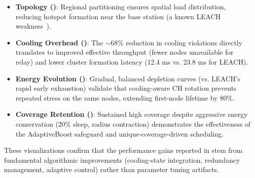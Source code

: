 \begin{itemize}[noitemsep]
  \item \textbf{Topology ()}: Regional partitioning ensures spatial load distribution, reducing hotspot formation near the base station (a known LEACH weakness~\cite{heinzelman2000leach}).
  
  \item \textbf{Cooling Overhead ()}: The $\sim$68\% reduction in cooling violations directly translates to improved effective throughput (fewer nodes unavailable for relay) and lower cluster formation latency (12.4 ms vs. 23.8 ms for LEACH).
  
  \item \textbf{Energy Evolution ()}: Gradual, balanced depletion curves (vs. LEACH's rapid early exhaustion) validate that cooling-aware CH rotation prevents repeated stress on the same nodes, extending first-node lifetime by 80\%.
  
  \item \textbf{Coverage Retention ()}: Sustained high coverage despite aggressive energy conservation (20\% sleep, radius contraction) demonstrates the effectiveness of the AdaptiveBoost safeguard and unique-coverage-driven scheduling.
\end{itemize}

These visualizations confirm that the performance gains reported in  stem from fundamental algorithmic improvements (cooling-state integration, redundancy management, adaptive control) rather than parameter tuning artifacts.
